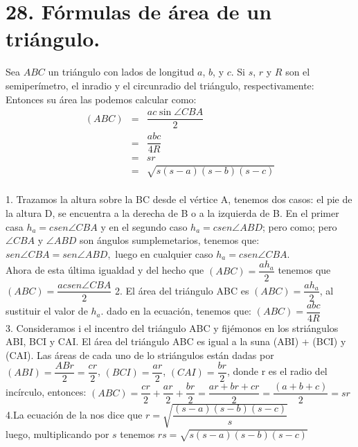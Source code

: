 \documentclass[12pt,a4paper, oneside]{book}
\begin{document}
\section{28. Fórmulas de área de un triángulo.}
Sea $ABC$ un triángulo con lados de longitud $a$, $b$, y $c$. Si $s$, $r$ y $R$ son el semiperímetro, el inradio y el circunradio del triángulo, respectivamente: Entonces su área las podemos calcular como:
\begin{eqnarray*}
(ABC)&=& \dfrac{ac \sin \angle CBA}{2}
\\&=& \dfrac{abc}{4R}
\\&=& sr
\\&=& \sqrt{s(s-a)(s-b)(s-c)}
\end{eqnarray*}
\\
1. Trazamos la altura sobre la BC desde el vértice A, tenemos dos casos: el pie de la altura D, se encuentra a la derecha de B o a la izquierda de B. En el primer casa $h_a= c sen \angle CBA$ y en el segundo caso $h_a= c sen \angle ABD$; pero como; pero $\angle CBA$ y $\angle ABD$ son ángulos sumplemetarios, tenemos que: $sen \angle CBA= sen \angle ABD,$ luego en cualquier caso $h_a=c sen \angle CBA$.
\\Ahora de 
esta última igualdad y del hecho que $(ABC)= \dfrac{a h_a}{2}$ tenemos que $(ABC)=\dfrac{ac sen \angle CBA}{2}$
2. El área del triángulo ABC es $(ABC)=\dfrac{ah_a}{2}$, al sustituir el valor de $h_a$. dado en la ecuación, tenemos que: $(ABC)=\dfrac{abc}{4R}$
\\3. Consideramos i el incentro del triángulo ABC y fijémonos en los striángulos ABI, BCI y CAI. El área del triángulo ABC es igual a la suna (ABI) + (BCI) y (CAI). Las áreas de cada uno de lo striángulos están dadas por $(ABI)= \dfrac{AB r}{2}= \dfrac{cr}{2}$, $(BCI)=\dfrac{ar}{2}$, $(CAI)=\dfrac{br}{2}$, donde r es el radio del incírculo, entonces:
$(ABC)=\dfrac{cr}{2}+\dfrac{ar}{2}+\dfrac{br}{2}=\dfrac{ar+br+cr}{2}=\dfrac{(a+b+c)}{2}=sr$
\\4.La ecuación de la nos dice que
$r=\sqrt{\dfrac{(s-a)(s-b)(s-c)}{s}}$
\\luego, multiplicando por $s$ tenemos
$ rs=\sqrt{s(s-a)(s-b)(s-c)}$
\end{document}
